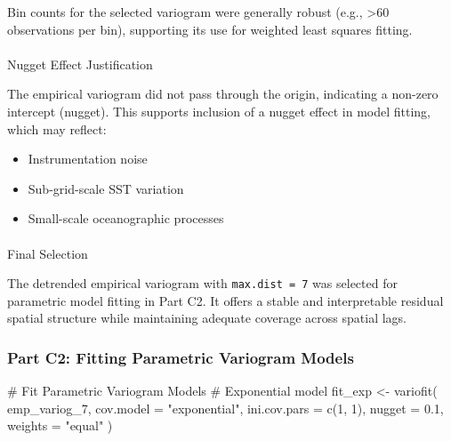 \documentclass[
  11pt,
]{article}
\makeatletter
\let\oldparagraph\paragraph
\renewcommand{\paragraph}{
    \@ifstar
      \xxxParagraphStar
      \xxxParagraphNoStar
  }
\newcommand{\xxxParagraphStar}[1]{\oldparagraph*{#1}\mbox{}}
\newcommand{\xxxParagraphNoStar}[1]{\oldparagraph{#1}\mbox{}}
\newenvironment{Shaded}{\begin{snugshade}}{\end{snugshade}}
\newcommand{\AttributeTok}[1]{\textcolor[rgb]{0.40,0.45,0.13}{#1}}
\newcommand{\CommentTok}[1]{\textcolor[rgb]{0.37,0.37,0.37}{#1}}
\newcommand{\DecValTok}[1]{\textcolor[rgb]{0.68,0.00,0.00}{#1}}
\newcommand{\FloatTok}[1]{\textcolor[rgb]{0.68,0.00,0.00}{#1}}
\newcommand{\FunctionTok}[1]{\textcolor[rgb]{0.28,0.35,0.67}{#1}}
\newcommand{\NormalTok}[1]{\textcolor[rgb]{0.00,0.23,0.31}{#1}}
\newcommand{\OtherTok}[1]{\textcolor[rgb]{0.00,0.23,0.31}{#1}}
\newcommand{\StringTok}[1]{\textcolor[rgb]{0.13,0.47,0.30}{#1}}
\makeatother
\begin{document}
Bin counts for the selected variogram were generally robust (e.g.,
\textgreater60 observations per bin), supporting its use for weighted
least squares fitting.

\paragraph{Nugget Effect
Justification}\label{nugget-effect-justification}

The empirical variogram did not pass through the origin, indicating a
non-zero intercept (nugget). This supports inclusion of a nugget effect
in model fitting, which may reflect:

\begin{itemize}
\item
  Instrumentation noise
\item
  Sub-grid-scale SST variation
\item
  Small-scale oceanographic processes
\end{itemize}

\paragraph{Final Selection}\label{final-selection}

The detrended empirical variogram with \texttt{max.dist\ =\ 7} was
selected for parametric model fitting in Part C2. It offers a stable and
interpretable residual spatial structure while maintaining adequate
coverage across spatial lags.

\subsubsection{Part C2: Fitting Parametric Variogram
Models}\label{part-c2-fitting-parametric-variogram-models}

\begin{Shaded}
\begin{Highlighting}[]
\CommentTok{\#  Fit Parametric Variogram Models}
\CommentTok{\# Exponential model}
\NormalTok{fit\_exp }\OtherTok{\textless{}{-}} \FunctionTok{variofit}\NormalTok{(}
\NormalTok{  emp\_variog\_7,}
  \AttributeTok{cov.model =} \StringTok{"exponential"}\NormalTok{,}
  \AttributeTok{ini.cov.pars =} \FunctionTok{c}\NormalTok{(}\DecValTok{1}\NormalTok{, }\DecValTok{1}\NormalTok{),}
  \AttributeTok{nugget =} \FloatTok{0.1}\NormalTok{,}
  \AttributeTok{weights =} \StringTok{"equal"}
\NormalTok{)}
\end{Highlighting}
\end{Shaded}
\end{document}
